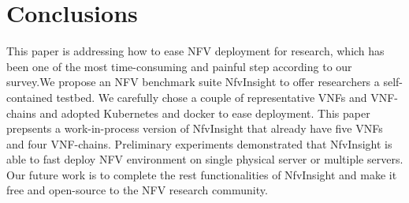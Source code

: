 \section{Conclusions}

This paper is addressing how to ease NFV deployment for research,
which has been one of the most time-consuming and painful step according 
to our survey.We propose an NFV benchmark suite NfvInsight to offer
researchers a self-contained testbed. We carefully chose 
a couple of representative VNFs and VNF-chains and adopted 
Kubernetes and docker to ease deployment. This paper prepsents
a work-in-process version of NfvInsight that already have five VNFs
and four VNF-chains. Preliminary experiments demonstrated
that NfvInsight is able to fast deploy NFV environment on single physical
server or multiple servers. Our future work is to complete the 
rest functionalities of NfvInsight and make it free and open-source to the
NFV research community. 
